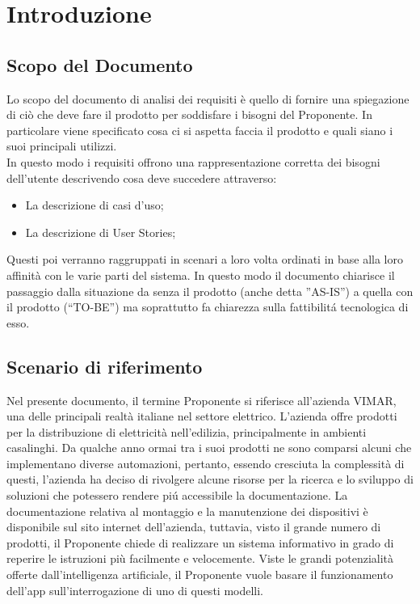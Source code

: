 \section{Introduzione}
\subsection{Scopo del Documento}
Lo scopo del documento di analisi dei requisiti è quello di fornire una spiegazione di ciò che deve fare il prodotto per soddisfare i bisogni del Proponente. In particolare viene specificato cosa ci si aspetta faccia il prodotto e quali siano i suoi principali utilizzi. \\
In questo modo i requisiti offrono una rappresentazione corretta dei bisogni dell’utente descrivendo cosa deve succedere attraverso:
\begin{itemize}
    \item La descrizione di casi d’uso;
    \item La descrizione di User Stories;
\end{itemize}
Questi poi verranno raggruppati in scenari a loro volta ordinati in base alla loro affinità con le varie parti del sistema. In questo modo il documento chiarisce il passaggio dalla situazione da senza il prodotto (anche detta ”AS-IS”) a quella con il prodotto (“TO-BE”) ma soprattutto fa chiarezza sulla fattibilitá tecnologica di esso.

\subsection{Scenario di riferimento} 
Nel presente documento, il termine Proponente si riferisce all'azienda VIMAR, una delle principali realtà italiane nel settore elettrico. L’azienda offre prodotti per la distribuzione di elettricità nell’edilizia, principalmente in ambienti casalinghi. Da qualche anno ormai tra i suoi prodotti ne sono comparsi alcuni che implementano diverse automazioni, pertanto, essendo cresciuta la complessità di questi, l’azienda ha deciso di rivolgere alcune risorse per la ricerca e lo sviluppo di soluzioni che potessero rendere piú accessibile la documentazione. La documentazione relativa al montaggio e la manutenzione dei dispositivi è disponibile sul sito internet dell’azienda, tuttavia, visto il grande numero di prodotti, il Proponente chiede di realizzare un sistema informativo in grado di reperire le istruzioni più facilmente e velocemente. Viste le grandi potenzialità offerte dall’intelligenza artificiale, il Proponente vuole basare il funzionamento dell’app sull’interrogazione di uno di questi modelli.

